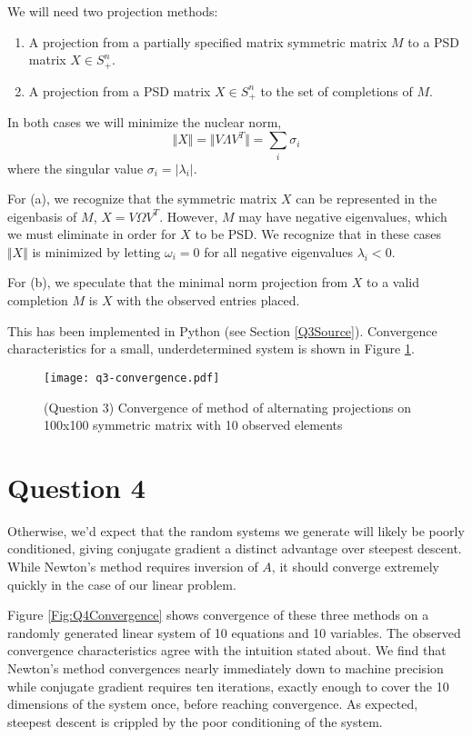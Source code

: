 \documentclass{article}
\begin{document}
We will need two projection methods:

\begin{enumerate}
\item A projection from a partially specified matrix symmetric matrix $M$
  to a PSD matrix $X \in S_+^n$.
\item A projection from a PSD matrix $X \in S_+^n$ to the set of
  completions of $M$.
\end{enumerate}

In both cases we will minimize the nuclear norm,
\[ \Vert X \Vert = \Vert V \Lambda V^T \Vert = \sum_i \sigma_i \]
where the singular value $\sigma_i = \vert \lambda_i \vert$.

For (a), we recognize that the symmetric matrix $X$ can be represented
in the eigenbasis of $M$, $X = V \Omega V^T$. However, $M$ may have
negative eigenvalues, which we must eliminate in order for $X$ to be
PSD. We recognize that in these cases $\Vert X \Vert$ is minimized by
letting $\omega_i = 0$ for all negative eigenvalues $\lambda_i <
0$.

For (b), we speculate that the minimal norm projection from $X$ to a
valid completion $M$ is $X$ with the observed entries placed.

This has been implemented in Python (see Section
\ref{Q3Source}). Convergence characteristics for a small,
underdetermined system is shown in Figure \ref{Fig:AltProjConv}.

\begin{figure}
  \center
  \texttt{[image: q3-convergence.pdf]}
  \caption{(Question 3) Convergence of method of alternating projections on 100x100
  symmetric matrix with 10 observed elements}
  \label{Fig:AltProjConv}
\end{figure}

\section{Question 4}

Otherwise, we'd expect that the random systems we generate will likely
be poorly conditioned, giving conjugate gradient a distinct advantage
over steepest descent. While Newton's method requires inversion of $A$,
it should converge extremely quickly in the case of our linear problem.

Figure \ref{Fig:Q4Convergence} shows convergence of these three methods on
a randomly generated linear system of 10 equations and 10
variables. The observed convergence characteristics agree with the
intuition stated about. We find that Newton's method convergences
nearly immediately down to machine precision while conjugate gradient
requires ten iterations, exactly enough to cover the 10 dimensions of
the system once, before reaching convergence. As expected, steepest
descent is crippled by the poor conditioning of the system.
\end{document}
